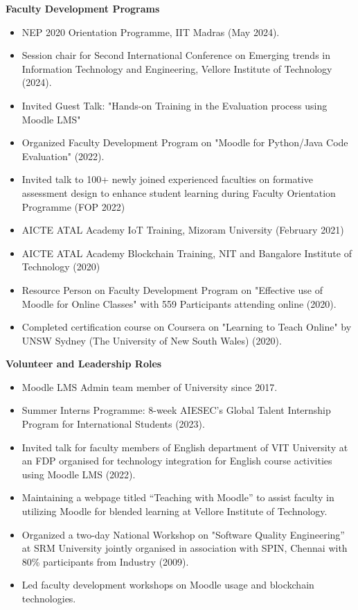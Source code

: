 \documentclass[a4paper,10pt]{article}
\newcommand{\cvsection}[1]{%
    \vspace{2mm}
    \begin{tcolorbox}
        \textbf{\large #1}
    \end{tcolorbox}
    \vspace{-4mm}
}
\begin{document}
\cvsection{Faculty Development Programs}
\begin{itemize}[leftmargin=*]
    \item NEP 2020 Orientation Programme, IIT Madras (May 2024).
    \item Session chair for Second International Conference on Emerging trends in Information Technology and Engineering, Vellore Institute of Technology (2024).
    \item Invited Guest Talk: "Hands-on Training in the Evaluation process using Moodle LMS"
    \item Organized Faculty Development Program on "Moodle for Python/Java Code Evaluation" (2022).
    \item Invited talk to 100+ newly joined experienced faculties on formative assessment design to enhance student learning during Faculty Orientation Programme (FOP 2022)
    \item AICTE ATAL Academy IoT Training, Mizoram University (February 2021)
    \item AICTE ATAL Academy Blockchain Training, NIT and Bangalore Institute of Technology (2020)
    \item Resource Person on Faculty Development Program on "Effective use of Moodle for Online Classes" with 559 Participants attending online (2020).
    \item Completed certification course on Coursera on "Learning to Teach Online" by UNSW Sydney (The University of New South Wales) (2020).
\end{itemize}

\cvsection{Volunteer and Leadership Roles}
\begin{itemize}[leftmargin=*]
	\item Moodle LMS Admin team member of University since 2017.
	\item Summer Interns Programme: 8-week AIESEC's Global Talent Internship Program for International Students (2023).
	\item Invited talk for faculty members of English department of VIT University at an FDP organised for technology integration for English course activities using Moodle LMS (2022).
	\item Maintaining a webpage titled “Teaching with Moodle” to assist faculty in utilizing Moodle for blended learning at Vellore Institute of Technology. 
    \item Organized a two-day National Workshop on "Software Quality Engineering” at SRM University jointly organised in association with SPIN, Chennai with 80\% participants from Industry (2009).
    \item Led faculty development workshops on Moodle usage and blockchain technologies.
    
\end{itemize}
\end{document}
